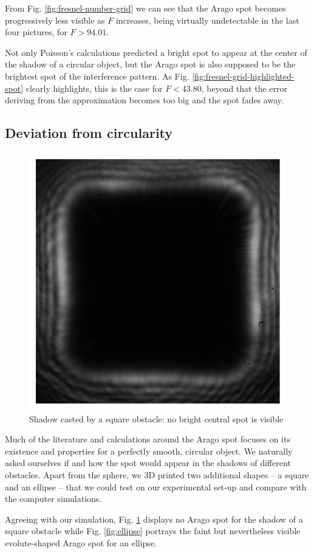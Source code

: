 \documentclass[11pt,a4paper]{article}
\begin{document}
From Fig. \ref{fig:fresnel-number-grid} we can see that the Arago spot becomes progressively less visible as $F$ increases, being virtually undetectable in the last four pictures, for $F > 94.01$. 

Not only Poisson's calculations predicted a bright spot to appear at the center of the shadow of a circular object, but the Arago spot is also supposed to be the brightest spot of the interference pattern. As Fig. \ref{fig:fresnel-grid-highlighted-spot} clearly highlights, this is the case for $F < 43.80$, beyond that the error deriving from the approximation becomes too big and the spot fades away.



\subsection{Deviation from circularity}

\begin{figure}[H]
    \centering
    \includegraphics[width=0.3\linewidth]{1 - Arago Spot/Images/square.pdf}
    \caption{Shadow casted by a square obstacle: no bright central spot is visible}
    \label{fig:square}    
\end{figure}

Much of the literature and calculations around the Arago spot focuses on its existence and properties for a perfectly smooth, circular object. We naturally asked ourselves if and how the spot would appear in the shadows of different obstacles. Apart from the sphere, we 3D printed two additional shapes -- a square and an ellipse -- that we could test on our experimental set-up and compare with the computer simulations.

Agreeing with our simulation, Fig. \ref{fig:square} displays no Arago spot for the shadow of a square obstacle while Fig. \ref{fig:ellipse} portrays the faint but nevertheless visible evolute-shaped Arago spot for an ellipse.
\end{document}
